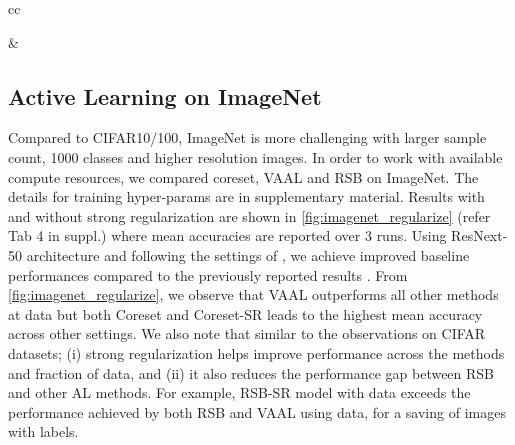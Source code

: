 \documentclass[10pt,twocolumn,letterpaper]{article}
\begin{document}
\begin{table*}[ht]
\begin{tabular}{cc}
\begin{minipage}{.65\linewidth}
         
         \end{minipage}
         & 
         \begin{minipage}{.35\linewidth}
            \centering
           
            \caption{RSB accuracy with and without strong regularization on CIFAR10 with noisy oracle.}
            \label{tab:NOISY_cifar_10_swa_randaug}
                        
           
         \end{minipage}
    \end{tabular}
    \vspace{-2em}
\end{table*}






\subsection{Active Learning on ImageNet}
Compared to CIFAR10/100, ImageNet is more challenging with larger sample count, 1000 classes and higher resolution images. In order to work with available compute resources, we compared coreset, VAAL and RSB on ImageNet. The details for training hyper-params are in supplementary material. Results with and without strong regularization are shown in \cref{fig:imagenet_regularize} (refer Tab 4 in suppl.) where mean accuracies are reported over 3 runs. Using ResNext-50 architecture \cite{resnext_50_xie2017aggregated} and following the settings of  \cite{S4L_DBLP:journals/corr/abs-1905-03670}, we achieve improved baseline performances compared to the previously reported results \cite{Ensembles_Beluch2018ThePO, VAAL_sinha2019variational}.
From \cref{fig:imagenet_regularize}, we observe that VAAL outperforms all other methods at  data but both Coreset and Coreset-SR leads to the highest mean accuracy across other settings. We also note that similar to the observations on CIFAR datasets; (i) strong regularization helps improve performance across the methods and fraction of data, and (ii) it also reduces the performance gap between RSB and other AL methods. For example, RSB-SR model with  data exceeds the performance achieved by both RSB and VAAL using  data, for a saving of  images with labels.
\end{document}
